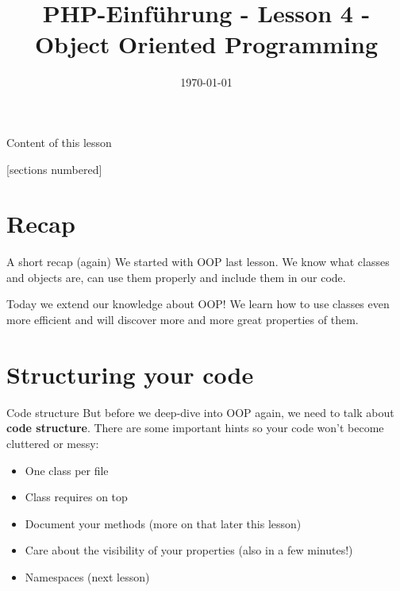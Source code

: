 


\newcommand{\topic}{
	PHP-Einführung - Lesson 4 - Object Oriented Programming
}

\title{\topic}
\date{\today}



\maketitle

\begin{frame}{Content of this lesson}

	[sections numbered]
	\tableofcontents

\end{frame}

\section{Recap}

\begin{frame}{A short recap (again)}
	We started with OOP last lesson. We know what classes and objects are, can use them properly and include them in our code.\pause

	Today we extend our knowledge about OOP! We learn how to use classes even more efficient and will discover more and more great properties of them.
\end{frame}

\section{Structuring your code}

\begin{frame}{Code structure}
	But before we deep-dive into OOP again, we need to talk about \textbf{code structure}. There are some important hints so your code won't become cluttered or messy: \pause
	
	\begin{itemize}
	\item One class per file\pause
	\item Class requires on top\pause
	\item Document your methods (more on that later this lesson)\pause
	\item Care about the visibility of your properties (also in a few minutes!)\pause
	\item Namespaces (next lesson)\pause
	\end{itemize}
\end{frame}

